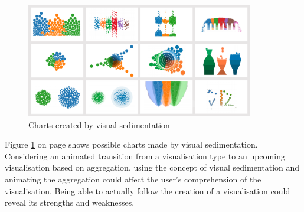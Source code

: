 \begin{figure}[!htb]
\centering
\includegraphics[height=5cm]{images/methods/related/visual-sedimentation}
\caption[
    Charts created by visual sedimentation .
]{Charts created by visual sedimentation}
\label{fig:visual-sedimentation}
\end{figure}

Figure \ref{fig:visual-sedimentation} on page \pageref{fig:visual-sedimentation} shows possible charts made by visual sedimentation. Considering an animated transition from a visualisation type to an upcoming visualisation based on aggregation, using the concept of visual sedimentation and animating the aggregation could affect the user's comprehension of the visualisation. Being able to actually follow the creation of a visualisation could reveal its strengths and weaknesses.